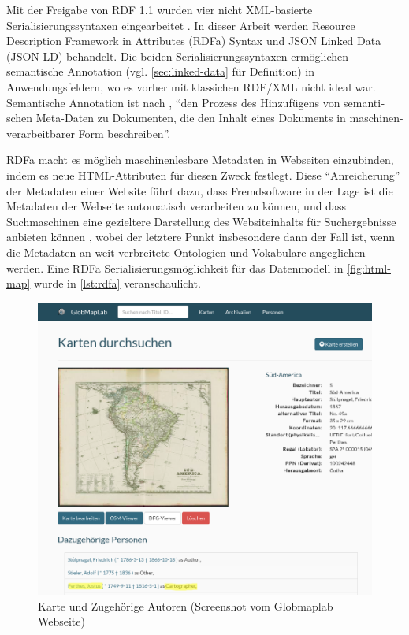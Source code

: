 \documentclass[float=false, crop=false]{standalone}
\begin{document}
Mit der Freigabe von RDF 1.1 wurden vier nicht XML-basierte Serialisierungssyntaxen eingearbeitet \autocite[vgl.][Abs.~3]{Wood:14:WNR}. In dieser Arbeit werden Resource Description Framework in Attributes (RDFa) Syntax und JSON Linked Data (JSON-LD) behandelt. Die beiden Serialisierungssyntaxen ermöglichen semantische Annotation (vgl. \autoref{sec:linked-data} für Definition) in Anwendungsfeldern, wo es vorher mit klassichen RDF/XML nicht ideal war. Semantische Annotation ist nach \citeauthor[S.~405f]{reif2006semantic}, \hyphenquote{german}{den Prozess des Hinzufügens von semantischen Meta-Daten zu Dokumenten, die den Inhalt eines Dokuments in maschinen-verarbeitbarer Form beschreiben}.

RDFa macht es möglich maschinenlesbare Metadaten in Webseiten einzubinden, indem es neue HTML-Attributen für diesen Zweck festlegt. Diese \hyphenquote{german}{Anreicherung} der Metadaten einer Website führt dazu, dass Fremdsoftware in der Lage ist die Metadaten der Webseite automatisch verarbeiten zu können, und dass Suchmaschinen eine gezieltere Darstellung des Websiteinhalts für Suchergebnisse anbieten können \autocite[vgl.][Abs.~2]{Schreiber:14:RP}, wobei der letztere Punkt insbesondere dann der Fall ist, wenn die Metadaten an weit verbreitete Ontologien und Vokabulare angeglichen werden. Eine RDFa Serialisierungsmöglichkeit für das Datenmodell in \autoref{fig:html-map} wurde in \autoref{lst:rdfa} veranschaulicht.

\begin{figure}[h]
	\centering
	\includegraphics[width=.7\linewidth]{images/htmlmap_marked}
	\caption[Karte und Zugehörige Autoren]{Karte und Zugehörige Autoren (Screenshot vom Globmaplab Webseite)}
	\label{fig:html-map}
\end{figure}
\end{document}
